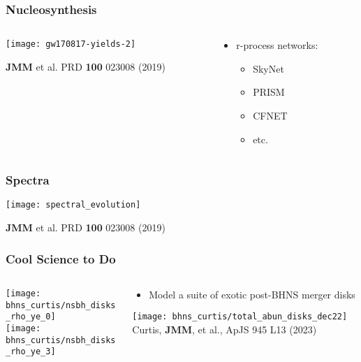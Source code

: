 \documentclass[]{beamer}
\begin{document}
\begin{frame}
  \frametitle{Nucleosynthesis}
  \begin{columns}
    \begin{column}{9cm}
      \begin{center}
        \texttt{[image: gw170817-yields-2]}
      \end{center}
      \begin{tiny}
        \textbf{JMM} et al. PRD \textbf{100} 023008 (2019)
      \end{tiny}
    \end{column}
    \begin{column}{3cm}
      \begin{itemize}
      \item r-process networks:
        \begin{itemize}
        \item SkyNet
        \item PRISM
        \item CFNET
        \item etc.
        \end{itemize}
      \end{itemize}
    \end{column}
  \end{columns}
\end{frame}

\begin{frame}
  \frametitle{Spectra}
  \begin{center}
    \texttt{[image: spectral\_evolution]}
  \end{center}
  \begin{tiny}
    \textbf{JMM} et al. PRD \textbf{100} 023008 (2019)
  \end{tiny}
\end{frame}

\begin{frame}
  \frametitle{Cool Science to Do}
  \begin{columns}
    \begin{column}{6cm}
      \begin{center}
        \texttt{[image: bhns\_curtis/nsbh\_disks\_rho\_ye\_0]}\\
        \texttt{[image: bhns\_curtis/nsbh\_disks\_rho\_ye\_3]}
      \end{center}
    \end{column}
    \begin{column}{6cm}
      \begin{itemize}
      \item Model a suite of exotic post-BHNS merger disks
      \end{itemize}
      \begin{center}
        \texttt{[image: bhns\_curtis/total\_abun\_disks\_dec22]}
        {\footnotesize Curtis, \textbf{JMM}, et al., ApJS 945 L13 (2023)}
      \end{center}
    \end{column}
  \end{columns}
\end{frame}
\end{document}
